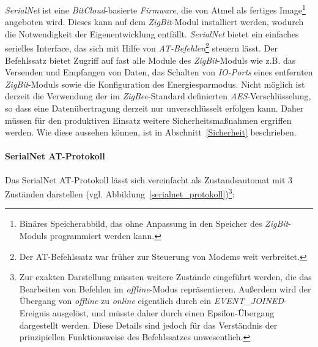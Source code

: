                 \emph{SerialNet} ist eine \emph{BitCloud}-basierte \emph{Firmware}, die von Atmel als fertiges Image\footnote{Binäres Speicherabbild,
                    das ohne Anpassung in den Speicher des \emph{ZigBit}-Moduls programmiert werden kann.} angeboten
                wird. Dieses kann auf dem \emph{ZigBit}-Modul installiert werden, wodurch die Notwendigkeit der 
                Eigenentwicklung entfällt. \emph{SerialNet} bietet ein einfaches serielles Interface, das sich mit
                Hilfe von \emph{AT-Befehlen}\footnote{Der AT-Befehlssatz war früher zur Steuerung von Modems weit 
                verbreitet.} 
                steuern lässt. Der Befehlssatz bietet Zugriff auf fast alle Module des \emph{ZigBit}-Moduls wie z.B. das
                Versenden und Empfangen von Daten, das Schalten von \emph{IO-Ports} eines entfernten 
                \emph{ZigBit}-Moduls sowie die
                Konfiguration des Energiesparmodus. Nicht möglich ist derzeit die Verwendung der im \emph{ZigBee}-Standard
                definierten \emph{AES}-Verschlüsselung, so dass eine Datenübertragung derzeit nur 
                unverschlüsselt erfolgen kann.
                Daher müssen für den produktiven Einsatz weitere Sicherheitsmaßnahmen ergriffen werden. Wie diese aussehen 
                können, ist in Abschnitt~\ref{Sicherheit} beschrieben. 

            \paragraph{SerialNet AT-Protokoll}


                Das SerialNet AT-Protokoll lässt sich vereinfacht als Zustandsautomat mit 3 Zuständen darstellen
                (vgl. Abbildung~\ref{serialnet_protokoll})\footnote{Zur exakten Darstellung müssten weitere 
                    Zustände eingeführt werden, die das Bearbeiten von Befehlen im \emph{offline}-Modus repräsentieren. 
                    Außerdem wird der Übergang von \emph{offline} zu \emph{online} eigentlich durch ein 
                    \emph{EVENT\_JOINED}-Ereignis ausgelöst, und müsste daher durch einen Epsilon-Übergang dargestellt
                    werden. Diese Details sind jedoch für das Verständnis der prinzipiellen Funktionsweise des 
                    Befehlssatzes unwesentlich.}:

